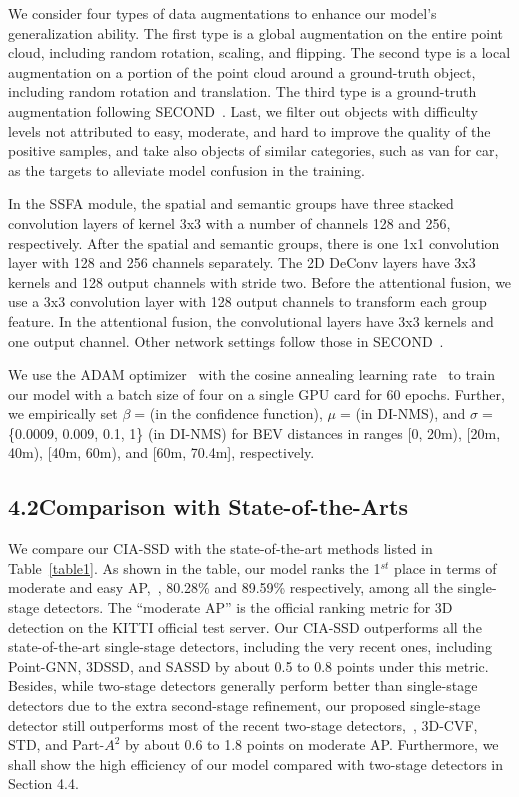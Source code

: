 \documentclass[letterpaper]{article}
\begin{document}
We consider four types of data augmentations to enhance our model's generalization ability.
The first type is a global augmentation on the entire point cloud, including random rotation, scaling, and flipping.
The second type is a local augmentation on a portion of the point cloud around a ground-truth object, including random rotation and translation.
The third type is a ground-truth augmentation following SECOND~\cite{yan2018second}.
Last, we filter out objects with difficulty levels not attributed to easy, moderate, and hard to improve the quality of the positive samples, and take also objects of similar categories, such as van for car, as the targets to alleviate model confusion in the training.


In the SSFA module, the spatial and semantic groups have three stacked convolution layers of kernel 3x3 with a number of channels 128 and 256, respectively.
After the spatial and semantic groups, there is one 1x1 convolution layer with 128 and 256 channels separately.
The 2D DeConv layers have 3x3 kernels and 128 output channels with stride two.
Before the attentional fusion, we use a 3x3 convolution layer with 128 output channels to transform each group feature.
In the attentional fusion, the convolutional layers have 3x3 kernels and one output channel.
Other network settings follow those in SECOND~\cite{yan2018second}.

We use the ADAM optimizer~\cite{kingma2014adam} with the cosine annealing learning rate~\cite{loshchilov2016sgdr} to train our model with a batch size of four on a single GPU card for 60 epochs.
Further, we empirically set $\beta\;$= (in the confidence function), $\mu\;$= (in DI-NMS), and $\sigma\;$=\;\{0.0009, 0.009, 0.1, 1\} (in DI-NMS) for BEV distances in ranges [0, 20m), [20m, 40m), [40m, 60m), and [60m, 70.4m], respectively.





\subsection{4.2\quad Comparison with State-of-the-Arts}
We compare our CIA-SSD with the state-of-the-art methods listed in Table~\ref{table1}.
As shown in the table, our model ranks the 1$^{st}$ place in terms of moderate and easy AP,~\ie, 80.28\% and 89.59\% respectively, among all the single-stage detectors.
The ``moderate AP'' is the official ranking metric for 3D detection on the KITTI official test server.
Our CIA-SSD outperforms all the state-of-the-art single-stage detectors, including the very recent ones, including Point-GNN, 3DSSD, and SASSD by about 0.5 to 0.8 points under this metric.
Besides, while two-stage detectors generally perform better than single-stage detectors due to the extra second-stage refinement,
our proposed single-stage detector still outperforms most of the recent two-stage detectors,~\eg, 3D-CVF, STD, and Part-$A^2$ by about 0.6 to 1.8 points on moderate AP.
Furthermore, we shall show the high efficiency of our model compared with two-stage detectors in Section {\color{red} 4.4}.
\end{document}
